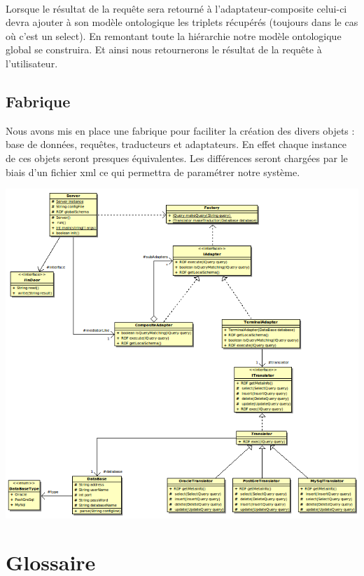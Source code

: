 \documentclass[12pt]{article}
\begin{document}
\\ Lorsque le résultat de la requête sera retourné à l'adaptateur-composite celui-ci devra ajouter à son modèle ontologique les triplets récupérés (toujours dans le cas où c'est un select). En remontant toute la hiérarchie notre modèle ontologique global se construira. Et ainsi nous retournerons le résultat de la requête à l'utilisateur.

\subsection{Fabrique}

Nous avons mis en place une fabrique pour faciliter la création des divers objets : base de données, requêtes, traducteurs et adaptateurs. En effet chaque instance de ces objets seront presques équivalentes. Les différences seront chargées par le biais d'un fichier xml ce qui permettra de paramétrer notre système.

\begin{center}
	\includegraphics[scale=0.75]{images/Serveur.png}
\end{center}

\newpage

\section{Glossaire}
\end{document}
